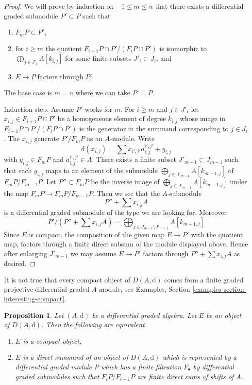 \documentclass{stacks-project}
\theoremstyle{plain}
\newtheorem{proposition}[subsection]{Proposition}
\theoremstyle{definition}
\theoremstyle{remark}
\numberwithin{equation}{subsection}
\begin{document}
\begin{proof}
We will prove by induction on $-1 \leq m \leq n$ that there exists
a differential graded submodule $P' \subset P$  such that
\begin{enumerate}
\item $F_mP \subset P'$,
\item for $i \geq m$ the quotient $F_{i + 1}P \cap P'/(F_iP \cap P')$ is
isomorphic to $\bigoplus_{j \in J'_i} A[k_{i, j}]$ for some finite subsets
$J'_i \subset J_i$, and
\item $E \to P$ factors through $P'$.
\end{enumerate}
The base case is $m = n$ where we can take $P' = P$.

\medskip\noindent
Induction step. Assume $P'$ works for $m$.
For $i \geq m$ and $j \in J'_i$ let $x_{i, j} \in F_{i + 1}P \cap P'$
be a homogeneous element of degree $k_{i, j}$ whose image in
$F_{i + 1}P \cap P'/(F_iP \cap P')$ is the generator in
the summand corresponding to $j \in J_i$. The
$x_{i, j}$ generate $P'/F_mP$ as an $A$-module. Write
$$
\text{d}(x_{i, j}) = \sum x_{i', j'} a_{i, j}^{i', j'} + y_{i, j}
$$
with $y_{i, j} \in F_mP$ and $a_{i, j}^{i', j'} \in A$.
There exists a finite subset
$J'_{m - 1} \subset J_{m - 1}$ such that each $y_{i, j}$ maps to
an element of the submodule $\bigoplus_{j \in J'_{m - 1}} A[k_{m - 1, j}]$
of $F_mP/F_{m - 1}P$. Let $P'' \subset F_mP$ be the inverse
image of $\bigoplus_{j \in J'_{m - 1}} A[k_{m - 1, j}]$ under
the map $F_mP \to F_mP/F_{m - 1}P$. Then we see that the $A$-submodule
$$
P'' + \sum x_{i, j}A
$$
is a differential graded submodule of the type we are looking for. Moreover
$$
P'/(P'' + \sum x_{i, j}A) =
\bigoplus\nolimits_{j \in J_{m - 1} \setminus J'_{m - 1}} A[k_{m - 1, j}]
$$
Since $E$ is compact, the composition of the given map $E \to P'$
with the quotient map, factors through a finite direct subsum of
the module displayed above. Hence after enlarging $J'_{m - 1}$
we may assume $E \to P'$ factors through
$P'' + \sum x_{i, j}A$ as desired.
\end{proof}

\noindent
It is not true that every compact object of $D(A, \text{d})$ comes
from a finite graded projective differential graded $A$-module,
see Examples, Section \ref{examples-section-interesting-compact}.

\begin{proposition}
\label{proposition-compact}
Let $(A, \text{d})$ be a differential graded algebra. Let $E$ be an
object of $D(A, \text{d})$. Then the following are equivalent
\begin{enumerate}
\item $E$ is a compact object,
\item $E$ is a direct summand of an object of $D(A, \text{d})$
which is represented by a differential graded module $P$ which
has a finite filtration $F_\bullet$ by differential graded submodules
such that $F_iP/F_{i - 1}P$ are finite direct sums of shifts of $A$.
\end{enumerate}
\end{proposition}
\end{document}
